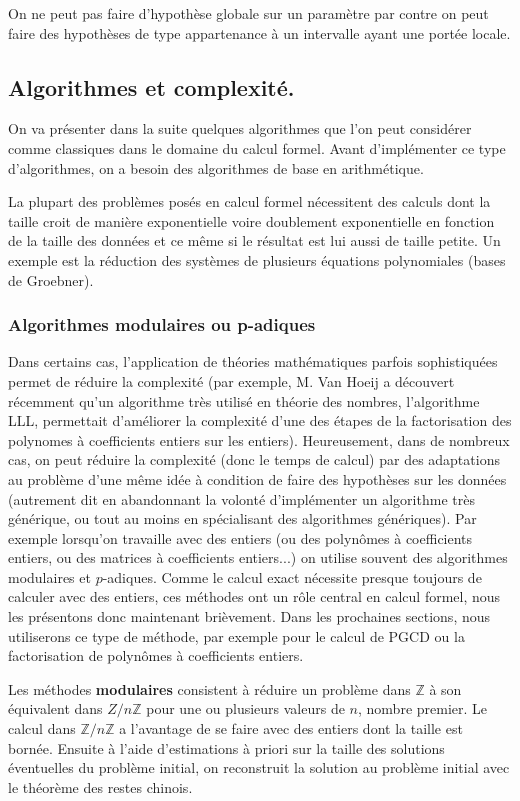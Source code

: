 \documentclass[a4paper,11pt]{article}
\newcommand{\Z}{{\mathbb{Z}}}
\begin{document}
\begin{giacjshere}
On ne peut pas faire d'hypothèse globale sur un paramètre par
contre on peut faire des hypothèses de type appartenance à un intervalle 
ayant une portée locale.

\subsection{Algorithmes et complexité.}
On va présenter dans la suite quelques algorithmes que l'on peut
considérer comme classiques dans le domaine du calcul formel. Avant 
d'implémenter ce type d'algorithmes, on a besoin des algorithmes de base
en arithmétique. 

La plupart des problèmes posés en calcul formel nécessitent des
calculs dont la taille croit de manière exponentielle voire
doublement exponentielle en fonction de la taille des données et
ce même si le résultat est lui aussi de taille petite. Un
exemple est la réduction des systèmes de plusieurs équations polynomiales
(bases de Groebner).

\subsubsection{Algorithmes modulaires ou p-adiques}
Dans certains cas, l'application de théories mathématiques
parfois sophistiquées permet de réduire la complexité (par exemple,
M. Van Hoeij a découvert récemment qu'un algorithme très utilisé en théorie des
nombres, l'algorithme LLL, permettait d'améliorer la complexité d'une des
étapes de la factorisation des polynomes à coefficients entiers sur les
entiers). Heureusement, dans de nombreux cas, on peut r\'eduire la
complexit\'e (donc le temps de calcul) par des adaptations au
probl\`eme d'une m\^eme id\'ee \`a condition de faire des
hypoth\`eses sur les donn\'ees (autrement dit en abandonnant la volont\'e
d'impl\'ementer un algorithme tr\`es g\'en\'erique, ou tout au moins
en sp\'ecialisant des algorithmes g\'en\'eriques).
 Par exemple lorsqu'on travaille
avec des entiers (ou des polyn\^omes \`a coefficients entiers, ou
des matrices \`a coefficients entiers...) on utilise souvent des algorithmes
modulaires et $p$-adiques. Comme le calcul exact n\'ecessite
presque toujours de calculer avec des entiers, ces m\'ethodes
ont un r\^ole central en calcul formel, nous les pr\'esentons donc
maintenant bri\`evement. Dans les prochaines sections, nous utiliserons
ce type de m\'ethode, par exemple pour le calcul de PGCD ou la factorisation
de polyn\^omes \`a coefficients entiers.

Les m\'ethodes {\bf modulaires} consistent \`a r\'eduire un probl\`eme dans 
$\Z$ \`a son \'equivalent dans $Z/n\Z$ pour une ou 
plusieurs valeurs de $n$, nombre premier. Le calcul dans $\Z/n\Z$
a l'avantage de se faire avec des entiers dont la taille est bornée.
Ensuite \`a l'aide d'estimations 
\`a priori sur la taille des solutions 
\'eventuelles du probl\`eme initial, on reconstruit la solution au problème
initial avec le th\'eor\`eme des restes chinois. 


\end{giacjshere}
\end{document}
